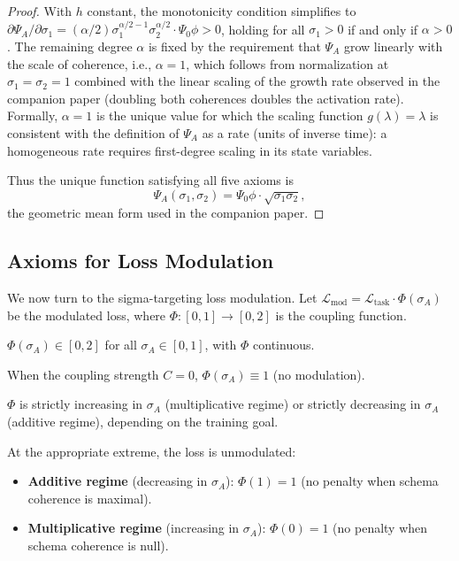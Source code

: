\begin{proof}
With $h$ constant, the monotonicity condition simplifies to
$\partial \Psi_A / \partial \sigma_1 = (\alpha/2) \sigma_1^{\alpha/2 - 1}
\sigma_2^{\alpha/2} \cdot \Psi_0 \phi > 0$, holding for all $\sigma_1 > 0$
if and only if $\alpha > 0$. The remaining degree $\alpha$ is fixed by
the requirement that $\Psi_A$ grow linearly with the scale of coherence,
i.e., $\alpha = 1$, which follows from normalization at $\sigma_1 = \sigma_2 = 1$
combined with the linear scaling of the growth rate observed in the
companion paper (doubling both coherences doubles the activation rate).
Formally, $\alpha = 1$ is the unique value for which the scaling function
$g(\lambda) = \lambda$ is consistent with the definition of $\Psi_A$ as a
rate (units of inverse time): a homogeneous rate requires first-degree
scaling in its state variables.

Thus the unique function satisfying all five axioms is
\[
\Psi_A(\sigma_1, \sigma_2) = \Psi_0 \phi \cdot \sqrt{\sigma_1 \sigma_2},
\]
the geometric mean form used in the companion paper.
\end{proof}

\subsection{Axioms for Loss Modulation}

We now turn to the sigma-targeting loss modulation. Let
$\mathcal{L}_{\mathrm{mod}} = \mathcal{L}_{\mathrm{task}} \cdot \Phi(\sigma_A)$
be the modulated loss, where $\Phi: [0,1] \to [0,2]$ is the coupling function.

\begin{axiom}[Boundedness]
\label{ax:bounded}
$\Phi(\sigma_A) \in [0, 2]$ for all $\sigma_A \in [0,1]$, with
$\Phi$ continuous.
\end{axiom}

\begin{axiom}
\label{ax:consistent}
When the coupling strength $C = 0$, $\Phi(\sigma_A) \equiv 1$ (no
modulation).
\end{axiom}

\begin{axiom}[Monotonicity]
\label{ax:coupling-monotonic}
$\Phi$ is strictly increasing in $\sigma_A$ (multiplicative regime) or
strictly decreasing in $\sigma_A$ (additive regime), depending on the
training goal.
\end{axiom}

\begin{axiom}
\label{ax:max-coherence}
At the appropriate extreme, the loss is unmodulated:
\begin{itemize}
\item \textbf{Additive regime} (decreasing in $\sigma_A$):
  $\Phi(1) = 1$ (no penalty when schema coherence is maximal).
\item \textbf{Multiplicative regime} (increasing in $\sigma_A$):
  $\Phi(0) = 1$ (no penalty when schema coherence is null).
\end{itemize}
\end{axiom}

